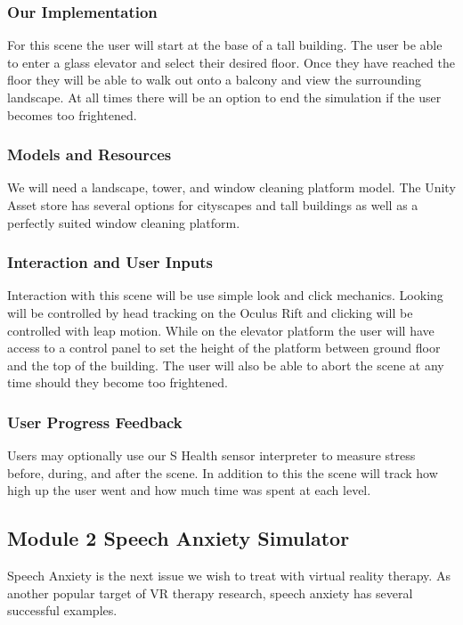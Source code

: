 \documentclass[a4paper,10pt]{article}
\begin{document}
\subsubsection{Our Implementation}
For this scene the user will start at the base of a tall building. The user be able to enter a glass elevator and select their desired floor. Once they have reached the floor they will be able to walk out onto a balcony and view the surrounding landscape. At all times there will be an option to end the simulation if the user becomes too frightened.

\subsubsection{Models and Resources}
We will need a landscape, tower, and window cleaning platform model. The Unity Asset store has several options for cityscapes and tall buildings as well as a perfectly suited window cleaning platform.

\subsubsection{Interaction and User Inputs}
Interaction with this scene will be use simple look and click mechanics. Looking will be controlled by head tracking on the Oculus Rift and clicking will be controlled with leap motion. While on the elevator platform the user will have access to a control panel to set the height of the platform between ground floor and the top of the building. The user will also be able to abort the scene at any time should they become too frightened. 

\subsubsection{User Progress Feedback}
Users may optionally use our S Health sensor interpreter to measure stress before, during, and after the scene. In addition to this the scene will track how high up the user went and how much time was spent at each level.

\pagebreak
\subsection{Module 2 Speech Anxiety Simulator}
Speech Anxiety is the next issue we wish to treat with virtual reality therapy. As another popular target of VR therapy research, speech anxiety has several successful examples.
\end{document}
